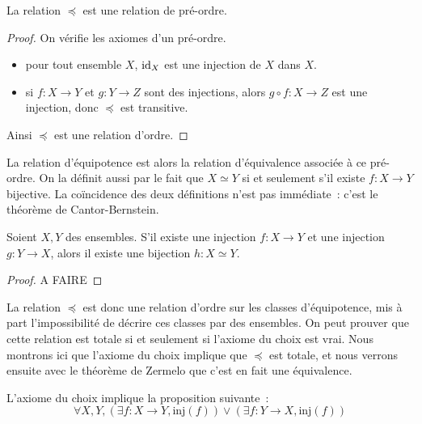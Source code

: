 \begin{property}
  La relation $\preceq$ est une relation de pré-ordre.
\end{property}

\begin{proof}
  On vérifie les axiomes d'un pré-ordre.
  \begin{itemize}
  \item pour tout ensemble $X$, $\operatorname{id}_X$ est une injection de $X$ dans $X$.
  \item si $f : X \to Y$ et $g : Y \to Z$ sont des injections, alors
    $g\circ f : X \to Z$ est une injection, donc $\preceq$ est transitive.
  \end{itemize}
  Ainsi $\preceq$ est une relation d'ordre.
\end{proof}

La relation d'équipotence est alors la relation d'équivalence associée à ce
pré-ordre. On la définit aussi par le fait que $X\simeq Y$ si et seulement s'il
existe $f : X \to Y$ bijective. La coïncidence des deux définitions n'est pas
immédiate~: c'est le théorème de Cantor-Bernstein.

\begin{theorem}
  Soient $X,Y$ des ensembles. S'il existe une injection $f : X \to Y$ et une
  injection $g : Y \to X$, alors il existe une bijection $h : X \simeq Y$.
\end{theorem}

\begin{proof}
  A FAIRE
\end{proof}

La relation $\preceq$ est donc une relation d'ordre sur les classes
d'équipotence, mis à part l'impossibilité de décrire ces classes par des
ensembles. On peut prouver que cette relation est totale si et seulement si
l'axiome du choix est vrai. Nous montrons ici que l'axiome du choix implique
que $\preceq$ est totale, et nous verrons ensuite avec le théorème de Zermelo
que c'est en fait une équivalence.

\begin{property}
  L'axiome du choix implique la proposition suivante~:
  \[\forall X,Y,(\exists f : X \to Y, \mathrm{inj}(f))\lor(\exists f : Y \to X,
  \mathrm{inj}(f))\]
\end{property}

